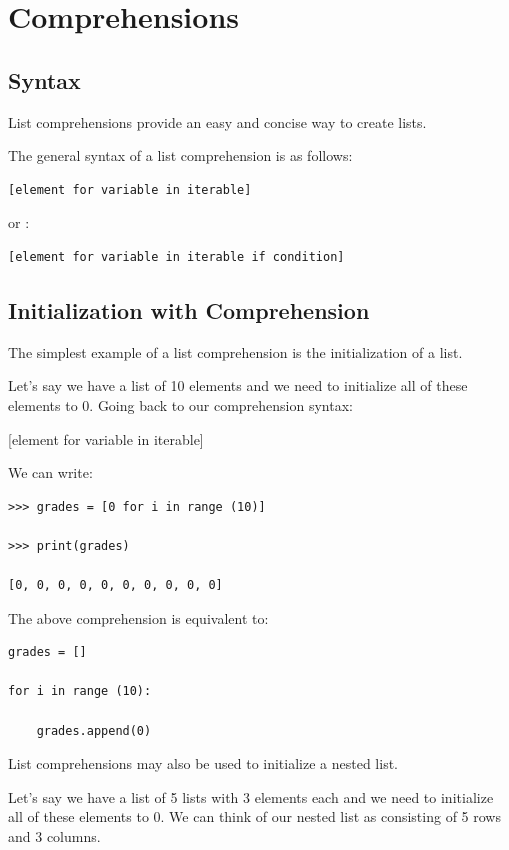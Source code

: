 \documentclass{article}
\begin{document}
\section{Comprehensions}
\subsection{Syntax}
List comprehensions provide an easy and concise way to create lists.

The general syntax of a list comprehension is as follows:

\begin{lstlisting}
[element for variable in iterable]
\end{lstlisting}

or :

\begin{lstlisting}
[element for variable in iterable if condition]	
\end{lstlisting}

\subsection{Initialization with Comprehension}
The simplest example of a list comprehension is the initialization of a list.

Let’s say we have a list of 10 elements and we need to initialize all of these elements to 0.  Going back to our comprehension syntax:

[element for variable in iterable]

We can write:

\begin{lstlisting}
>>> grades = [0 for i in range (10)]

>>> print(grades)

[0, 0, 0, 0, 0, 0, 0, 0, 0, 0]
\end{lstlisting}

The above comprehension is equivalent to:

\begin{lstlisting}
grades = []

for i in range (10):

    grades.append(0)
\end{lstlisting}

List comprehensions may also be used to initialize a nested list.

Let’s say we have a list of 5 lists with 3 elements each  and we need to initialize all of these elements to 0.  We can think of our nested list as consisting of 5 rows and 3 columns.
\end{document}
